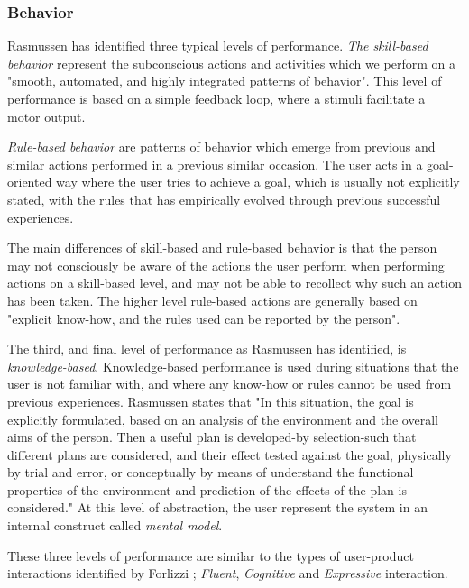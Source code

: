 \subsubsection{Behavior}
Rasmussen \cite{Rasmussen1983} has identified three typical levels of performance. \textit{The skill-based behavior} represent the subconscious actions and activities which we perform on a "smooth, automated, and highly integrated patterns of behavior". This level of performance is based on a simple feedback loop, where a stimuli facilitate a motor output. 

\textit{Rule-based behavior} are patterns of behavior which emerge from previous and similar actions performed in a previous similar occasion. The user acts in a goal-oriented way where the user tries to achieve a goal, which is usually not explicitly stated, with the rules that has empirically evolved through previous successful experiences.

The main differences of skill-based and rule-based behavior is that the person may not consciously be aware of the actions the user perform when performing actions on a skill-based level, and may not be able to recollect why such an action has been taken. The higher level rule-based actions are generally based on "explicit know-how, and the rules used can be reported by the person".

The third, and final level of performance as Rasmussen \cite{Rasmussen1983} has identified, is \textit{knowledge-based}. Knowledge-based performance is used during situations that the user is not familiar with, and where any know-how or rules cannot be used from previous experiences. Rasmussen \cite{Rasmussen1983} states that "In this situation, the goal is explicitly formulated, based on an analysis of the environment and the overall aims of the person. Then a useful plan is developed-by selection-such that different plans are considered, and their effect tested against the goal, physically by trial and error, or conceptually by means of understand the functional properties of the environment and prediction of the effects of the plan is considered." At this level of abstraction, the user represent the system in an internal construct called \textit{mental model}.

These three levels of performance are similar to the types of user-product interactions identified by Forlizzi \cite{Forlizzi2004}; \textit{Fluent}, \textit{Cognitive} and \textit{Expressive} interaction.

